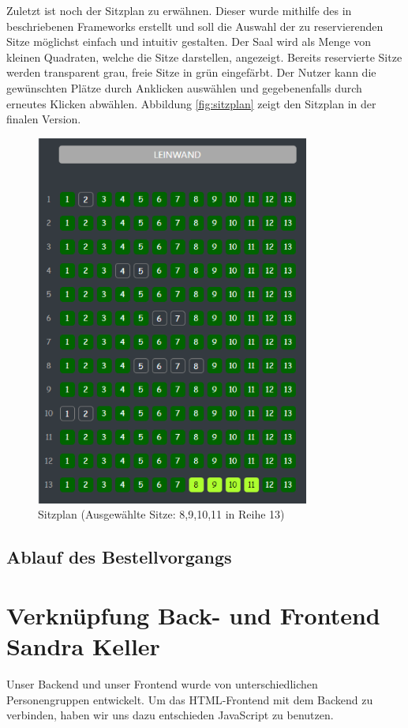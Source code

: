 	Zuletzt ist noch der Sitzplan zu erwähnen. Dieser wurde mithilfe des in %
	beschriebenen Frameworks erstellt und soll die Auswahl der zu reservierenden Sitze möglichst einfach und intuitiv gestalten. Der Saal wird als Menge von kleinen Quadraten, welche die Sitze darstellen, angezeigt. Bereits reservierte Sitze werden transparent grau, freie Sitze in grün eingefärbt. Der Nutzer kann die gewünschten Plätze durch Anklicken auswählen und gegebenenfalls durch erneutes Klicken abwählen. Abbildung \vref{fig:sitzplan} zeigt den Sitzplan in der finalen Version.
	
	\begin{figure}[H]
		\centering 
		\includegraphics[width=9cm]{img/sitzplan.png}
		\captionsetup{format=hang}
		\caption[Sitzplan]{\label{fig:sitzplan} Sitzplan (Ausgewählte Sitze: 8,9,10,11 in Reihe 13)}
	\end{figure}

	\subsection{Ablauf des Bestellvorgangs}
	
	
	\section[Verknüpfung Back- und Frontend]{Verknüpfung Back- und Frontend {\hfill \normalsize Sandra Keller}}
	Unser Backend und unser Frontend wurde von unterschiedlichen Personengruppen entwickelt. Um das \ac{HTML}-Frontend mit dem Backend zu verbinden, haben wir uns dazu entschieden JavaScript zu benutzen.
	
